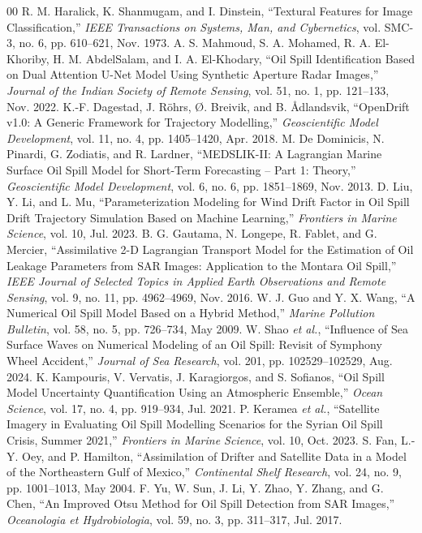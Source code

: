 \documentclass[conference]{IEEEtran}
\begin{document}
\begin{thebibliography}{00}
 R. M. Haralick, K. Shanmugam, and I. Dinstein, ``Textural Features for Image Classification,'' \emph{IEEE Transactions on Systems, Man, and Cybernetics}, vol. SMC-3, no. 6, pp. 610–621, Nov. 1973.
 A. S. Mahmoud, S. A. Mohamed, R. A. El-Khoriby, H. M. AbdelSalam, and I. A. El-Khodary, ``Oil Spill Identification Based on Dual Attention U-Net Model Using Synthetic Aperture Radar Images,'' \emph{Journal of the Indian Society of Remote Sensing}, vol. 51, no. 1, pp. 121–133, Nov. 2022.
 K.-F. Dagestad, J. Röhrs, Ø. Breivik, and B. Ådlandsvik, ``OpenDrift v1.0: A Generic Framework for Trajectory Modelling,'' \emph{Geoscientific Model Development}, vol. 11, no. 4, pp. 1405–1420, Apr. 2018.
 M. De Dominicis, N. Pinardi, G. Zodiatis, and R. Lardner, ``MEDSLIK-II: A Lagrangian Marine Surface Oil Spill Model for Short-Term Forecasting – Part 1: Theory,'' \emph{Geoscientific Model Development}, vol. 6, no. 6, pp. 1851–1869, Nov. 2013.
 D. Liu, Y. Li, and L. Mu, ``Parameterization Modeling for Wind Drift Factor in Oil Spill Drift Trajectory Simulation Based on Machine Learning,'' \emph{Frontiers in Marine Science}, vol. 10, Jul. 2023.
 B. G. Gautama, N. Longepe, R. Fablet, and G. Mercier, ``Assimilative 2-D Lagrangian Transport Model for the Estimation of Oil Leakage Parameters from SAR Images: Application to the Montara Oil Spill,'' \emph{IEEE Journal of Selected Topics in Applied Earth Observations and Remote Sensing}, vol. 9, no. 11, pp. 4962–4969, Nov. 2016.
 W. J. Guo and Y. X. Wang, ``A Numerical Oil Spill Model Based on a Hybrid Method,'' \emph{Marine Pollution Bulletin}, vol. 58, no. 5, pp. 726–734, May 2009.
 W. Shao \emph{et al.}, ``Influence of Sea Surface Waves on Numerical Modeling of an Oil Spill: Revisit of Symphony Wheel Accident,'' \emph{Journal of Sea Research}, vol. 201, pp. 102529–102529, Aug. 2024.
 K. Kampouris, V. Vervatis, J. Karagiorgos, and S. Sofianos, ``Oil Spill Model Uncertainty Quantification Using an Atmospheric Ensemble,'' \emph{Ocean Science}, vol. 17, no. 4, pp. 919–934, Jul. 2021.
 P. Keramea \emph{et al.}, ``Satellite Imagery in Evaluating Oil Spill Modelling Scenarios for the Syrian Oil Spill Crisis, Summer 2021,'' \emph{Frontiers in Marine Science}, vol. 10, Oct. 2023.
 S. Fan, L.-Y. Oey, and P. Hamilton, ``Assimilation of Drifter and Satellite Data in a Model of the Northeastern Gulf of Mexico,'' \emph{Continental Shelf Research}, vol. 24, no. 9, pp. 1001–1013, May 2004.
 F. Yu, W. Sun, J. Li, Y. Zhao, Y. Zhang, and G. Chen, ``An Improved Otsu Method for Oil Spill Detection from SAR Images,'' \emph{Oceanologia et Hydrobiologia}, vol. 59, no. 3, pp. 311–317, Jul. 2017.

\end{thebibliography}
\end{document}
